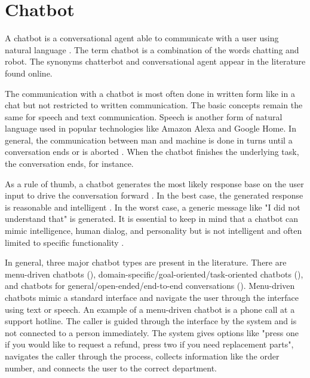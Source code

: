\section{Chatbot} \label{sec:chatbot}
A chatbot is a conversational agent able to communicate with a user using natural language 
\cite{evaluateChatbotsShawar2007, shawar2007chatbots, huang2007extracting, gregori2017evaluation}.
The term chatbot is a combination of the words chatting and robot.
The synonyms chatterbot and conversational agent appear in the literature found online.

The communication with a chatbot is most often done in written form like in a chat but not restricted to written communication. 
The basic concepts remain the same for speech and text communication.
Speech is another form of natural language used in popular technologies like Amazon Alexa and Google Home.
In general, the communication between man and machine is done in turns until a conversation ends or is aborted \cite{vrajitoru2004evolutionary}.
When the chatbot finishes the underlying task, the conversation ends, for instance.

As a rule of thumb, a chatbot generates the most likely response base on the user input to drive the conversation forward \cite{dutta2017developing}.
In the best case, the generated response is reasonable and intelligent \cite{vrajitoru2004evolutionary}. 
In the worst case, a generic message like "I did not understand that" is generated.
It is essential to keep in mind that a chatbot can mimic intelligence, human dialog, and personality but is not intelligent and often limited to specific functionality \cite{kane2016role, dutta2017developing}.

In general, three major chatbot types are present in the literature.
There are menu-driven chatbots (\citet{singhbuilding}), domain-specific/goal-oriented/task-oriented chatbots (\citet{deshpande2017survey, luis2015williams, braunEvaluatingNLU, williams2017hybrid}),
and chatbots for general/open-ended/end-to-end conversations (\citet{brandtzaeg2018chatbots, singhbuilding}).
Menu-driven chatbots mimic a standard interface and navigate the user through the interface using text or speech.
An example of a menu-driven chatbot is a phone call at a support hotline.
The caller is guided through the interface by the system and is not connected to a person immediately.
The system gives options like "press one if you would like to request a refund, press two if you need replacement parts", navigates the caller through the process, collects information like the order number, and 
connects the user to the correct department.

